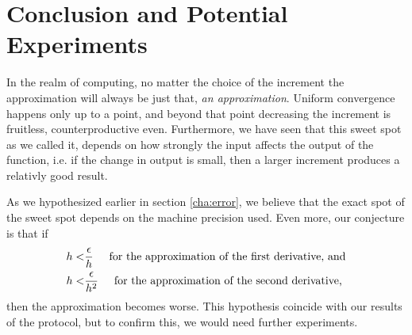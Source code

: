 \section{Conclusion and Potential Experiments}\label{cha:conclusion}

In the realm of computing, no matter the choice of the increment the approximation will always be just that, \textit{an approximation}. Uniform convergence happens only up to a point, and beyond that point decreasing the increment is fruitless, counterproductive even. Furthermore, we have seen that this sweet spot as we called it, depends on how strongly the input affects the output of the function, i.e. if the change in output is small, then a larger increment produces a relativly good result.

As we hypothesized earlier in section \ref{cha:error}, we believe that the exact spot of the sweet spot depends on the machine precision used. Even more, our conjecture is that if
\begin{align*}
    h <& \frac{\epsilon}{h} \hspace{0.5cm} \text{for the approximation of the first derivative, and}\\
    h <& \frac{\epsilon}{h^2} \hspace{0.5cm} \text{for the approximation of the second derivative,}
\end{align*}
then the approximation becomes worse. This hypothesis coincide with our results of the protocol, but to confirm this, we would need further experiments.